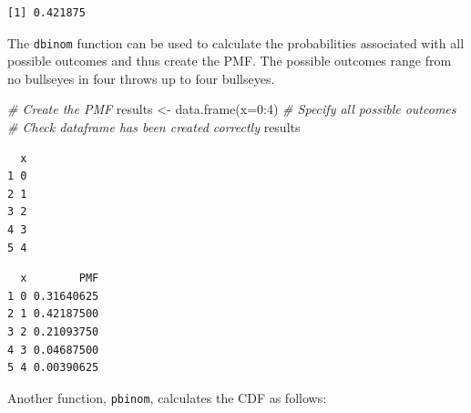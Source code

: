 \documentclass[
  oneside]{krantz}
\newenvironment{Shaded}{\begin{snugshade}}{\end{snugshade}}
\newcommand{\AttributeTok}[1]{\textcolor[rgb]{0.77,0.63,0.00}{#1}}
\newcommand{\CommentTok}[1]{\textcolor[rgb]{0.56,0.35,0.01}{\textit{#1}}}
\newcommand{\DecValTok}[1]{\textcolor[rgb]{0.00,0.00,0.81}{#1}}
\newcommand{\FunctionTok}[1]{\textcolor[rgb]{0.00,0.00,0.00}{#1}}
\newcommand{\NormalTok}[1]{#1}
\newcommand{\OtherTok}[1]{\textcolor[rgb]{0.56,0.35,0.01}{#1}}
\newcommand{\SpecialCharTok}[1]{\textcolor[rgb]{0.00,0.00,0.00}{#1}}
\begin{document}
\begin{verbatim}
[1] 0.421875
\end{verbatim}

The \texttt{dbinom} function can be used to calculate the probabilities associated with all possible outcomes and thus create the PMF. The possible outcomes range from no bullseyes in four throws up to four bullseyes.

\begin{Shaded}
\begin{Highlighting}[]
\CommentTok{\# Create the PMF }
\NormalTok{results }\OtherTok{\textless{}{-}} \FunctionTok{data.frame}\NormalTok{(}\AttributeTok{x=}\DecValTok{0}\SpecialCharTok{:}\DecValTok{4}\NormalTok{) }\CommentTok{\# Specify all possible outcomes}
\CommentTok{\# Check dataframe has been created correctly}
\NormalTok{results}
\end{Highlighting}
\end{Shaded}

\begin{verbatim}
  x
1 0
2 1
3 2
4 3
5 4
\end{verbatim}

\begin{Shaded}
\end{Shaded}

\begin{verbatim}
  x        PMF
1 0 0.31640625
2 1 0.42187500
3 2 0.21093750
4 3 0.04687500
5 4 0.00390625
\end{verbatim}

Another function, \texttt{pbinom}, calculates the CDF as follows:

\begin{Shaded}
\end{Shaded}
\end{document}
